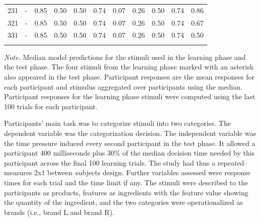 \documentclass[a4paper,man,natbib]{apa6}
\begin{document}
\begin{table}
\begin{center}
\begin{threeparttable}
\begin{tabular}{ccccccccccc}
231 & - & 0.85 & 0.50 & 0.50 & 0.74 & 0.07 & 0.26 & 0.50 & 0.74 & 0.86\\
321 & - & 0.85 & 0.50 & 0.50 & 0.74 & 0.07 & 0.26 & 0.50 & 0.74 & 0.67\\
331 & - & 0.85 & 0.50 & 0.50 & 0.74 & 0.07 & 0.26 & 0.50 & 0.74 & 0.50\\
\bottomrule
\addlinespace
\end{tabular}
\begin{tablenotes}[para]
\textit{Note.} Median model predictions for the stimuli used in the learning phase and the test phase. The four stimuli from the learning phase marked with an asterisk also appeared in the test phase. Participant responses are the mean responses for each participant and stimulus aggregated over participants using the median. Participant responses for the learning phase stimuli were computed using the last 100 trials for each participant.
\end{tablenotes}
\end{threeparttable}
\end{center}
\end{table}

Participants' main task was to categorize stimuli into two categories. The dependent variable was the categorization decision. The independent variable was the time pressure induced every second participant in the test phase. It allowed a participant 400 milliseconds plus 30\% of the median decision time needed by this participant across the final 100 learning trials. The study had thus a repeated--measures 2x1 between--subjects design. Further variables assessed were response times for each trial and the time limit if any. The stimuli were described to the participants as products, features as ingredients with the feature value showing the quantity of the ingredient, and the two categories were operationalized as brands (i.e., brand L and brand R). 
\end{document}
